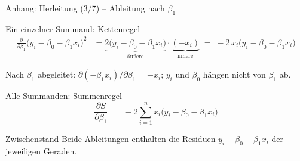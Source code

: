 \documentclass[aspectratio=169,11pt]{beamer}
\begin{document}
\begin{frame}{Anhang: Herleitung (3/7) -- Ableitung nach $\beta_1$}
  \begin{block}{Ein einzelner Summand: Kettenregel}
    \vspace{-6pt}
    \begin{align*}
      \frac{\partial}{\partial \beta_1}\bigl(y_i - \beta_0 - \beta_1 x_i\bigr)^{2}
        &= \underbrace{2\bigl(y_i - \beta_0 - \beta_1 x_i\bigr)}_{\text{äußere}}
           \cdot \underbrace{(-x_i)}_{\text{innere}}
         \;=\; -2\,x_i\bigl(y_i - \beta_0 - \beta_1 x_i\bigr)
    \end{align*}
    \vspace{-10pt}

    \footnotesize Nach $\beta_1$ abgeleitet: $\partial(-\beta_1 x_i)/\partial \beta_1 = -x_i$;
    $y_i$ und $\beta_0$ hängen nicht von $\beta_1$ ab.
  \end{block}

  \medskip

  \begin{block}{Alle Summanden: Summenregel}
    \[
      \frac{\partial S}{\partial \beta_1}
      \;=\; -2\sum_{i=1}^{n} x_i\bigl(y_i - \beta_0 - \beta_1 x_i\bigr)
    \]
    \vspace{-8pt}
  \end{block}

  \medskip

  \begin{exampleblock}{Zwischenstand}
    Beide Ableitungen enthalten die Residuen $y_i - \beta_0 - \beta_1 x_i$ der
    jeweiligen Geraden.
  \end{exampleblock}
\end{frame}
\end{document}
